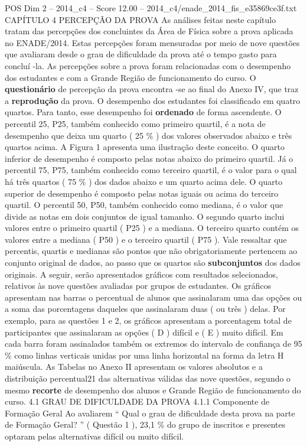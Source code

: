 \begin{textsample}{POS Dim 2 – 2014\_c4 – Score 12.00 – 2014\_c4/enade\_2014\_fis\_e35869ce3f.txt}  \label{ex:f2_pos_112}
CAPÍTULO 4 PERCEPÇÃO DA PROVA As análises feitas neste capítulo tratam das percepções dos concluintes da Área de Física sobre a prova aplicada no ENADE/2014.
Estas percepções foram mensuradas por meio de nove questões que avaliaram desde o grau de dificuldade da prova até o tempo gasto para concluí -la.
As percepções sobre a prova foram relacionadas com o desempenho dos estudantes e com a Grande Região de funcionamento do curso.
O \textbf{questionário} de percepção da prova encontra -se ao final do Anexo IV, que traz a \textbf{reprodução} da prova.
O desempenho dos estudantes foi classificado em quatro quartos.
Para tanto, esse desempenho foi \textbf{ordenado} de forma ascendente.
O percentil 25, P25, também conhecido como primeiro quartil, é a nota de desempenho que deixa um quarto ( 25 \% ) dos valores observados abaixo e três quartos acima.
A Figura 1 apresenta uma ilustração deste conceito.
O quarto inferior de desempenho é composto pelas notas abaixo do primeiro quartil.
Já o percentil 75, P75, também conhecido como terceiro quartil, é o valor para o qual há três quartos ( 75 \% ) dos dados abaixo e um quarto acima dele.
O quarto superior de desempenho é composto pelas notas iguais ou acima do terceiro quartil.
O percentil 50, P50, também conhecido como mediana, é o valor que divide as notas em dois conjuntos de igual tamanho.
O segundo quarto inclui valores entre o primeiro quartil ( P25 ) e a mediana.
O terceiro quarto contém os valores entre a mediana ( P50 ) e o terceiro quartil ( P75 ).
Vale ressaltar que percentis, quartis e medianas são pontos que não obrigatoriamente pertencem ao conjunto original de dados, ao passo que os quartos são \textbf{subconjuntos} dos dados originais.
A seguir, serão apresentados gráficos com resultados selecionados, relativos às nove questões avaliadas por grupos de estudantes.
Os gráficos apresentam nas barras o percentual de alunos que assinalaram uma das opções ou a soma das porcentagens daqueles que assinalaram duas ( ou três ) delas.
Por exemplo, para as questões 1 e 2, os gráficos apresentam a porcentagem total de participantes que assinalaram as opções ( D ) difícil e ( E ) muito difícil.
Em cada barra foram assinalados também os extremos do intervalo de confiança de 95 \% como linhas verticais unidas por uma linha horizontal na forma da letra H maiúscula.
As Tabelas no Anexo II apresentam os valores absolutos e a distribuição percentual21 das alternativas válidas das nove questões, segundo o mesmo \textbf{recorte} de desempenho dos alunos e Grande Região de funcionamento do curso. 4.1 GRAU DE DIFICULDADE DA PROVA 4.1.1 Componente de Formação Geral Ao avaliarem “ Qual o grau de dificuldade desta prova na parte de Formação Geral? ” ( Questão 1 ), 23,1 \% do grupo de inscritos e presentes optaram pelas alternativas difícil ou muito difícil.

\end{textsample}
